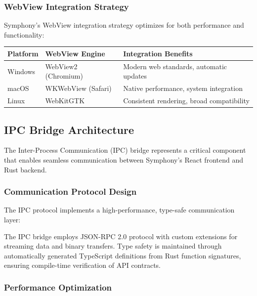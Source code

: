 \subsubsection*{WebView Integration Strategy}

Symphony's WebView integration strategy optimizes for both performance and functionality:

\begin{center}
\begin{tabular}{@{}lll@{}}
\toprule
\textbf{Platform} & \textbf{WebView Engine} & \textbf{Integration Benefits} \\
\midrule
Windows & WebView2 (Chromium) & Modern web standards, automatic updates \\
macOS & WKWebView (Safari) & Native performance, system integration \\
Linux & WebKitGTK & Consistent rendering, broad compatibility \\
\bottomrule
\end{tabular}
\end{center}

\subsection*{IPC Bridge Architecture}

The Inter-Process Communication (IPC) bridge represents a critical component that enables seamless communication between Symphony's React frontend and Rust backend.

\subsubsection*{Communication Protocol Design}

The IPC protocol implements a high-performance, type-safe communication layer:

\begin{infobox}[title=IPC Protocol Characteristics]
The IPC bridge employs JSON-RPC 2.0 protocol with custom extensions for streaming data and binary transfers. Type safety is maintained through automatically generated TypeScript definitions from Rust function signatures, ensuring compile-time verification of API contracts.
\end{infobox}

\subsubsection*{Performance Optimization}

